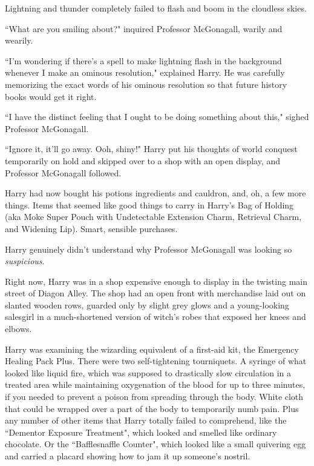 Lightning and thunder completely failed to flash and boom in the cloudless skies.

``What are you smiling about?" inquired Professor McGonagall, warily and wearily.

``I'm wondering if there's a spell to make lightning flash in the background whenever I make an ominous resolution," explained Harry. He was carefully memorizing the exact words of his ominous resolution so that future history books would get it right.

``I have the distinct feeling that I ought to be doing something about this," sighed Professor McGonagall.

``Ignore it, it'll go away. Ooh, shiny!" Harry put his thoughts of world conquest temporarily on hold and skipped over to a shop with an open display, and Professor McGonagall followed.

\later

Harry had now bought his potions ingredients and cauldron, and, oh, a few more things. Items that seemed like good things to carry in Harry's Bag of Holding (aka Moke Super Pouch  with Undetectable Extension Charm, Retrieval Charm, and Widening Lip). Smart, sensible purchases.

Harry genuinely didn't understand why Professor McGonagall was looking so \emph{suspicious}.

Right now, Harry was in a shop expensive enough to display in the twisting main street of Diagon Alley. The shop had an open front with merchandise laid out on slanted wooden rows, guarded only by slight grey glows and a young-looking salesgirl in a much-shortened version of witch's robes that exposed her knees and elbows.

Harry was examining the wizarding equivalent of a first-aid kit, the Emergency Healing Pack Plus. There were two self-tightening tourniquets. A syringe of what looked like liquid fire, which was supposed to drastically slow circulation in a treated area while maintaining oxygenation of the blood for up to three minutes, if you needed to prevent a poison from spreading through the body. White cloth that could be wrapped over a part of the body to temporarily numb pain. Plus any number of other items that Harry totally failed to comprehend, like the ``Dementor Exposure Treatment", which looked and smelled like ordinary chocolate. Or the ``Bafflesnaffle Counter", which looked like a small quivering egg and carried a placard showing how to jam it up someone's nostril.

